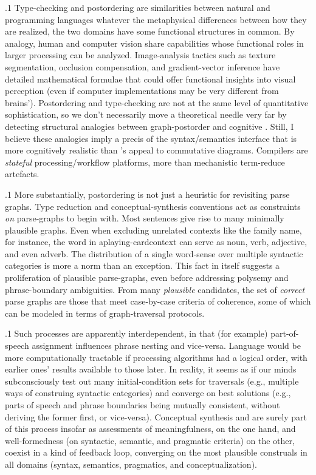 \documentclass[11pt, twocolumn]{article}
\begin{document}
\p.1{%
\:\+Type-checking and postordering are 
similarities between natural and programming languages
\mdash{} whatever the metaphysical differences between how
they are realized, the two domains have some
functional structures in common. \>  By analogy,
human and computer vision share capabilities
whose functional roles in larger processing 
can be analyzed. \>  Image-analysis tactics such as texture
segmentation, occlusion compensation, and gradient-vector inference
have detailed mathematical formulae that could offer functional insights into
visual perception (even if computer implementations may
be very different from brains'). \>  Postordering and type-checking are
not at the same level of quantitative sophistication,
so we don't necessarily move a theoretical needle very far
by detecting structural analogies between graph-postorder
and cognitive . \>  Still,
I believe these analogies imply a precis of the
syntax/semantics interface that is more cognitively realistic
than \Boltetal{}'s appeal to commutative diagrams. \>  Compilers
are \textit{stateful} processing/workflow platforms,
more than mechanistic term-reduce artefacts.\<\;
}%

\p.1{%
\:\+More substantially, postordering is not just a heuristic
for revisiting parse graphs. \>  Type reduction and
conceptual-synthesis conventions act as constraints
\textit{on} parse-graphs to begin with. \>  Most sentences give rise
to many minimally plausible graphs. \>  Even when excluding
unrelated contexts like the family name, for instance, the
word  in aplaying-cardcontext can serve as noun,
verb, adjective, and even adverb. \>  The distribution of a
single word-sense over multiple syntactic categories is more a
norm than an exception. \>  This fact in itself suggests a proliferation
of plausible parse-graphs, even before addressing polysemy and
phrase-boundary ambiguities. \>  From many \textit{plausible} candidates,
the set of \textit{correct} parse graphs are those that meet
case-by-case criteria of coherence, some of which can be modeled in terms
of graph-traversal protocols.\<\;
}%

\p.1{%
\:\+Such processes are apparently interdependent, in that (for example)
part-of-speech assignment influences phrase nesting and vice-versa. \> 
Language would be more computationally tractable if processing algorithms
had a logical order, with earlier ones'
results available to those later. \>  In reality,
it seems as if our minds subconsciously test out many
initial-condition sets for traversals (e.g., multiple ways
of construing syntactic categories) and converge on best solutions
(e.g., parts of speech and phrase boundaries
being mutually consistent, without deriving the former first,
or vice-versa). \>  Conceptual synthesis and  are
surely part of this process insofar as assessments of meaningfulness, on the
one hand, and well-formedness (on syntactic, semantic, and pragmatic criteria)
on the other, coexist in a kind of feedback loop, converging on the most plausible
construals in all domains (syntax, semantics, pragmatics, and conceptualization).\<\;
}%
\end{document}
